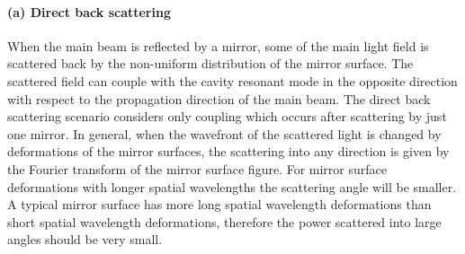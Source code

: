 




\paragraph{(a) Direct back scattering}
When the main beam is reflected by a mirror, some of the main light field is scattered back
by the non-uniform distribution of the mirror surface.
The scattered field can couple with the cavity resonant mode
in the opposite direction with respect to the propagation direction of the main beam.
The direct back scattering scenario considers only coupling
which occurs after scattering by just one mirror.
In general,  when the wavefront of the scattered light is changed
by deformations of the mirror surfaces,
the scattering into any direction is given by the Fourier transform
of the mirror surface figure.
For mirror surface deformations with longer spatial wavelengths
the scattering angle will be smaller.
A typical mirror surface has more long spatial wavelength deformations
than short spatial wavelength deformations,
therefore the power scattered into large angles should be very small.

